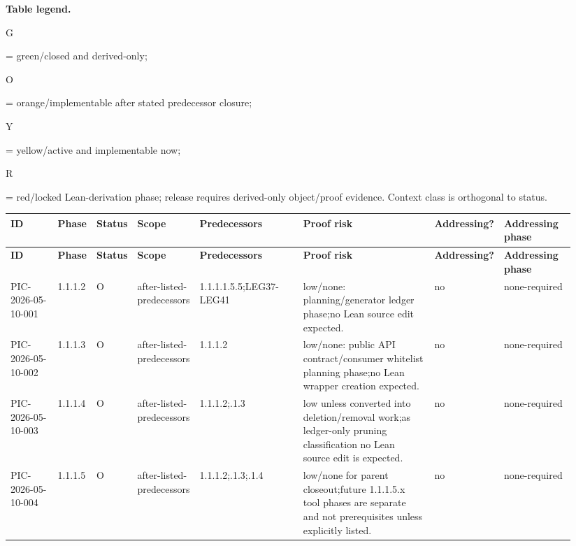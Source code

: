 \footnotesize
\par\smallskip\noindent\begin{minipage}{0.99\linewidth}\footnotesize\raggedright\textbf{Table legend.} \colorbox{green!18}{\strut G} = green/closed and derived-only; \colorbox{orange!28}{\strut O} = orange/implementable after stated predecessor closure; \colorbox{yellow!25}{\strut Y} = yellow/active and implementable now; \colorbox{red!20}{\strut R} = red/locked Lean-derivation phase; release requires derived-only object/proof evidence. Context class is orthogonal to status.\end{minipage}\par\vspace{0.25em}
\begin{longtable}{L{0.095\linewidth} L{0.055\linewidth} L{0.04\linewidth} L{0.105\linewidth} L{0.19\linewidth} L{0.25\linewidth} L{0.07\linewidth} L{0.135\linewidth}}
\hline
\textbf{ID} & \textbf{Phase} & \textbf{Status} & \textbf{Scope} & \textbf{Predecessors} & \textbf{Proof risk} & \textbf{Addressing?} & \textbf{Addressing phase}\\
\hline
\endfirsthead
\hline
\textbf{ID} & \textbf{Phase} & \textbf{Status} & \textbf{Scope} & \textbf{Predecessors} & \textbf{Proof risk} & \textbf{Addressing?} & \textbf{Addressing phase}\\
\hline
\endhead
PIC-2026-05-10-001 & 1.1.1.2 & O & after-listed-predecessors & 1.1.1.1.5.5;\newline LEG37-LEG41 & low/\allowbreak{}none: planning/\allowbreak{}generator ledger phase;\newline no Lean source edit expected. & no & none-required\\
\hline
\addlinespace[0.24em]
PIC-2026-05-10-002 & 1.1.1.3 & O & after-listed-predecessors & 1.1.1.2 & low/\allowbreak{}none: public API contract/\allowbreak{}consumer whitelist planning phase;\newline no Lean wrapper creation expected. & no & none-required\\
\hline
\addlinespace[0.24em]
PIC-2026-05-10-003 & 1.1.1.4 & O & after-listed-predecessors & 1.1.1.2;.1.3 & low unless converted into deletion/\allowbreak{}removal work;\newline as ledger-only pruning classification no Lean source edit is expected. & no & none-required\\
\hline
\addlinespace[0.24em]
PIC-2026-05-10-004 & 1.1.1.5 & O & after-listed-predecessors & 1.1.1.2;.1.3;.1.4 & low/\allowbreak{}none for parent closeout;\newline future 1.1.1.5.x tool phases are separate and not prerequisites unless explicitly listed. & no & none-required\\

\end{longtable}
